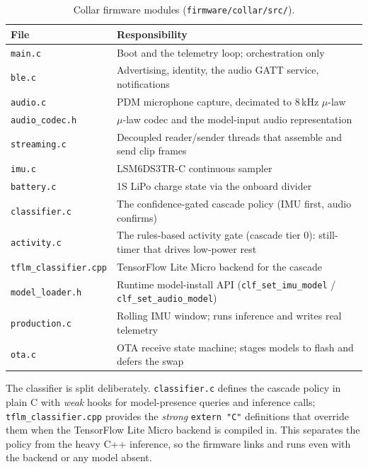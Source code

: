 \begin{table}[ht]
  \centering
  \caption{Collar firmware modules (\texttt{firmware/collar/src/}).}
  \label{tab:collar-src}
  \begin{tabularx}{\textwidth}{@{}lX@{}}
    \toprule
    \textbf{File} & \textbf{Responsibility} \\
    \midrule
    \texttt{main.c}            & Boot and the telemetry loop; orchestration only \\
    \texttt{ble.c}             & Advertising, identity, the audio GATT service, notifications \\
    \texttt{audio.c}           & PDM microphone capture, decimated to 8\,kHz $\mu$-law \\
    \texttt{audio\_codec.h}    & $\mu$-law codec and the model-input audio representation \\
    \texttt{streaming.c}       & Decoupled reader/sender threads that assemble and send clip frames \\
    \texttt{imu.c}             & LSM6DS3TR-C continuous sampler \\
    \texttt{battery.c}         & 1S LiPo charge state via the onboard divider \\
    \texttt{classifier.c}      & The confidence-gated cascade policy (IMU first, audio confirms) \\
    \texttt{activity.c}        & The rules-based activity gate (cascade tier 0): still-timer that drives low-power rest \\
    \texttt{tflm\_classifier.cpp} & TensorFlow Lite Micro backend for the cascade \\
    \texttt{model\_loader.h}   & Runtime model-install API (\texttt{clf\_set\_imu\_model} / \texttt{clf\_set\_audio\_model}) \\
    \texttt{production.c}      & Rolling IMU window; runs inference and writes real telemetry \\
    \texttt{ota.c}             & OTA receive state machine; stages models to flash and defers the swap \\
    \bottomrule
  \end{tabularx}
\end{table}

The classifier is split deliberately. \texttt{classifier.c} defines the cascade policy in plain C
with \emph{weak} hooks for model-presence queries and inference calls; \texttt{tflm\_classifier.cpp}
provides the \emph{strong} \texttt{extern\,"C"} definitions that override them when the TensorFlow
Lite Micro backend is compiled in. This separates the policy from the heavy C++ inference, so the
firmware links and runs even with the backend or any model absent.

